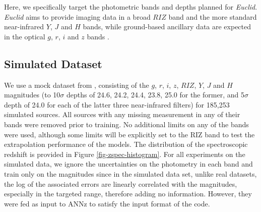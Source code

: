 \documentclass[useAMS,usenatbib,fleqn]{mn2e}
\begin{document}
Here, we specifically target the photometric bands and depths planned for {\em Euclid}. {\em Euclid} aims to provide imaging data in a broad $RIZ$ band and the more standard near-infrared $Y$, $J$ and $H$ bands, while ground-based ancillary data are expected in the optical $g$, $r$, $i$ and $z$ bands \citep{laureijs2011}. 


\subsection{Simulated Dataset}
\label{sec-dataset}

We use a mock dataset from \citet{jouvel09}, consisting of the $g$, $r$, $i$, $z$, $RIZ$, $Y$, $J$ and $H$ magnitudes (to 10$\sigma$ depths of 24.6, 24.2, 24.4, 23.8, 25.0 for the former, and 5$\sigma$ depth of 24.0 for each of the latter three near-infrared filters) for 185,253 simulated sources. All sources with any missing measurement in any of their bands were removed prior to training. No additional limits on any of the bands were used, although some limits will be explicitly set to the RIZ band to test the extrapolation performance of the models. The distribution of the spectroscopic redshift is provided in Figure \ref{fig-zspec-histogram}. For all experiments on the simulated data, we ignore the uncertainties on the photometry in each band and train only on the magnitudes since in the simulated data set, unlike real datasets, the log of the associated errors are linearly correlated with the magnitudes, especially in the targeted range, therefore adding no information. However, they were fed as input to {\sc ANNz} to satisfy the input format of the code.
\end{document}
